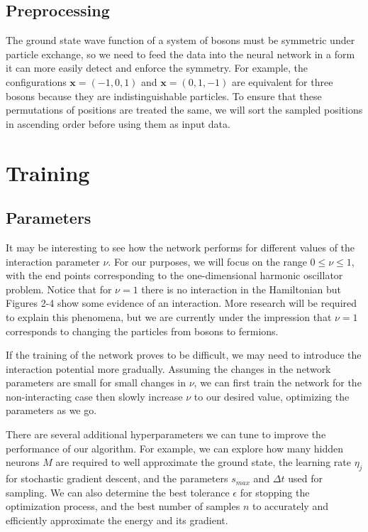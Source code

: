 \documentclass[prb,aps,twocolumn,showpacs,10pt]{revtex4-1}
\begin{document}

\subsection{Preprocessing}

The ground state wave function of a system of bosons must be symmetric under particle exchange, so we need to feed the data into the neural network in a form it can more easily detect and enforce the symmetry. For example, the configurations $\bm{x}=(-1,0,1)$ and $\bm{x}=(0,1,-1)$ are equivalent for three bosons because they are indistinguishable particles. To ensure that these permutations of positions are treated the same, we will sort the sampled positions in ascending order before using them as input data. 



\section{Training}


\subsection{Parameters}
It may be interesting to see how the network performs for different values of the interaction parameter $\nu$. For our purposes, we will focus on the range $0\leq\nu\leq1$, with the end points corresponding to the one-dimensional harmonic oscillator problem. Notice that for $\nu=1$ there is no interaction in the Hamiltonian but Figures 2-4 show some evidence of an interaction. More research will be required to explain this phenomena, but we are currently under the impression that $\nu=1$ corresponds to changing the particles from bosons to fermions. 

If the training of the network proves to be difficult, we may need to introduce the interaction potential more gradually. Assuming the changes in the network parameters are small for small changes in $\nu$, we can first train the network for the non-interacting case then slowly increase $\nu$ to our desired value, optimizing the parameters as we go. 

There are several additional hyperparameters we can tune to improve the performance of our algorithm. For example, we can explore how many hidden neurons $M$ are required to well approximate the ground state, the learning rate $\eta_j$ for stochastic gradient descent, and the parameters $s_{max}$ and $\Delta t$ used for sampling. We can also determine the best tolerance $\epsilon$ for stopping the optimization process, and the best number of samples $n$ to accurately and efficiently approximate the energy and its gradient.
\end{document}
